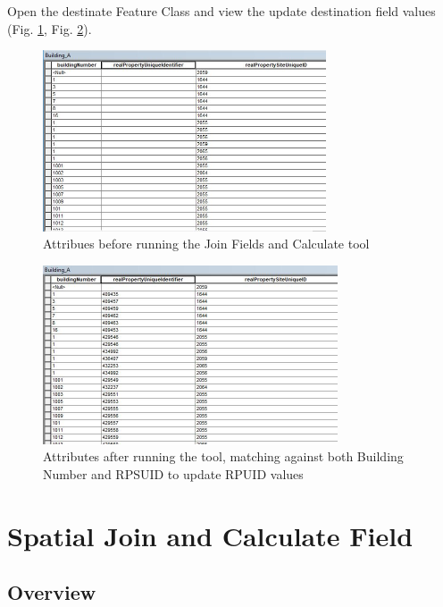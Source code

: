 \documentclass[openany]{book}
\theoremstyle{definition}
\theoremstyle{definition}
\theoremstyle{definition}
\theoremstyle{remark}
\begin{document}
Open the destinate Feature Class and view the update destination field
values (Fig. \ref{fig:jcbefore}, Fig. \ref{fig:jcafter}).

\begin{figure}[H]

{\centering \includegraphics[width=3.3in,]{figures/joinCalc-before} 

}

\caption{Attribues before running the Join Fields and Calculate tool}\label{fig:jcbefore}
\end{figure}

\begin{figure}[H]

{\centering \includegraphics[width=3.44in,]{figures/joinCalc-results} 

}

\caption{Attributes after running the tool, matching against both Building Number and RPSUID to update RPUID values}\label{fig:jcafter}
\end{figure}

\hypertarget{spatjoinCalc}{\chapter{Spatial Join and Calculate
Field}\label{spatjoinCalc}}

\section{Overview}\label{overview-3}
\end{document}
